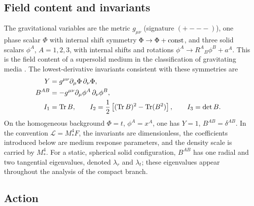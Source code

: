 \documentclass[12pt,a4paper]{article}
\begin{document}
\subsection{Field content and invariants}
\label{sec:fields}

The gravitational variables are the metric $g_{\mu\nu}$ (signature $(+---)$),
one phase scalar $\Phi$ with internal shift symmetry
$\Phi\to\Phi+{\rm const}$, and three solid scalars $\phi^A$, $A=1,2,3$, with
internal shifts and rotations $\phi^A\to R^A{}_B\phi^B+a^A$. This is the field
content of a supersolid medium in the classification of gravitating media
\cite{NicolisEtAl2015,CeloriaComelliPilo2017}. The lowest-derivative
invariants consistent with these symmetries are
\begin{align*}
Y &= g^{\mu\nu}\partial_\mu\Phi\,\partial_\nu\Phi,\\
B^{AB} &= -g^{\mu\nu}\partial_\mu\phi^A\,\partial_\nu\phi^B,\\
I_1 &= {\rm Tr}\,B,\qquad
I_2=\frac{1}{2}\left[({\rm Tr}\,B)^2-{\rm Tr}(B^2)\right],\qquad
I_3=\det B.
\end{align*}
On the homogeneous background $\Phi=t$, $\phi^A=x^A$, one has $Y=1$,
$B^{AB}=\delta^{AB}$. In the convention $\mathcal L=M_*^4F$, the invariants
are dimensionless, the coefficients introduced below are medium response
parameters, and the density scale is carried by $M_*^4$. For a static,
spherical solid configuration, $B^{AB}$ has one radial and two tangential
eigenvalues, denoted $\lambda_r$ and $\lambda_t$; these eigenvalues appear
throughout the analysis of the compact branch.

\subsection{Action}
\label{sec:action}
\end{document}
